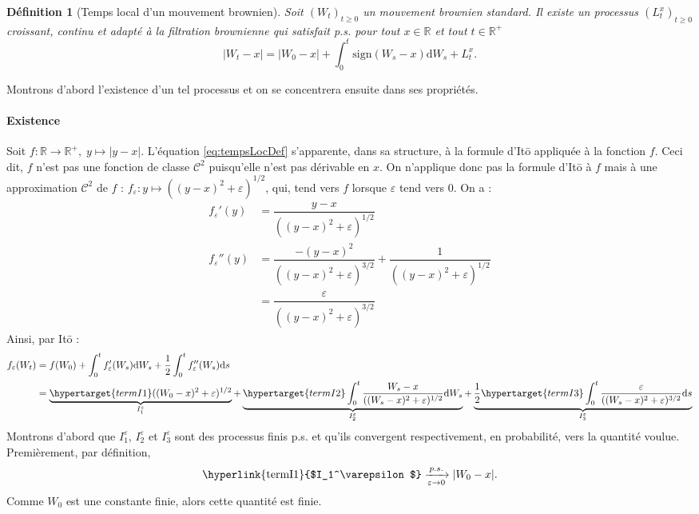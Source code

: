 \documentclass[openany]{book}
\makeatletter
\newcommand{\R}{\mathbb{R}}
\newcommand{\1}{\mathbbm{1}}
\newcommand{\sign}{\text{sign}}
\renewcommand{\d}{\mathrm{d}}
\renewenvironment{proof}[1][\textbf{\textit{Démonstration}}]{%
  \par\pushQED{\qed}%
  \normalfont\topsep6\p@\@plus6\p@\relax
  \trivlist\item[\hskip\labelsep
    #1\@addpunct{.}]\ignorespaces
}{%
  \popQED\endtrivlist\@endpefalse
}
\theoremstyle{thmfont}
\theoremstyle{deffont}
\newtheorem{definition}[definition]{Définition}
\theoremstyle{thmfont}
\theoremstyle{deffont}
\makeatother
\begin{document}
\begin{definition}[Temps local d'un mouvement brownien]
  \label{def:TempsLoc}
  Soit $(W_t)_{t\geq0}$ un mouvement brownien standard. Il existe un processus $(L_t^x)_{t\geq0}$ croissant, continu et adapté à la filtration brownienne qui satisfait p.s. pour tout $x \in \R$ et tout $t \in \R^+$
  \begin{equation}
    |W_t -x|  = |W_0-x| + \int_0^t\sign(W_s - x)\d W_s + L_t^x.
    \label{eq:tempsLocDef}
  \end{equation}
\end{definition}

\begin{proof} Montrons d'abord l'existence d'un tel processus et on se concentrera ensuite dans ses propriétés.

  \paragraph{Existence}
  Soit $f : \R \rightarrow \R^+,\; y \mapsto |y-x|$. L'équation \eqref{eq:tempsLocDef} s'apparente, dans sa structure, à la formule d'Itō appliquée à la fonction $f$. Ceci dit, $f$ n'est pas une fonction de classe $\mathcal C^2$ puisqu'elle n'est pas dérivable en $x$. On n'applique donc pas la formule d'Itō à $f$ mais à une approximation $\mathcal C^2$ de $f$ : $f_\varepsilon : y \mapsto ((y-x)^2 +\varepsilon)^{1/2}$, qui, tend vers $f$ lorsque $\varepsilon$ tend vers 0. On a :
  \begin{align*}
    f_\varepsilon'(y) &= \dfrac{y-x}{((y-x)^2 +\varepsilon)^{1/2}}\\
    f_\varepsilon''(y)&= \dfrac{-(y-x)^2}{((y-x)^2 +\varepsilon)^{3/2}} + \dfrac{1}{((y-x)^2 +\varepsilon)^{1/2}}\\
              &= \dfrac{\varepsilon}{((y-x)^2 +\varepsilon)^{3/2}}
  \end{align*}
  Ainsi, par Itō :
  \begin{align}
    f_\varepsilon(W_t) &= f(W_0) + \int_0^t f_\varepsilon'(W_s) \d W_s + \dfrac{1}{2} \int_0^t f_\varepsilon''(W_s) \d s\label{eq:tempsLocApprox}\\
             &= \underbrace{\hypertarget{termI1}((W_0 -x)^2 + \varepsilon)^{1/2}}_{I_1^\varepsilon}
               + \underbrace{\hypertarget{termI2}\int_0^t \dfrac{W_s-x}{((W_s-x)^2 +\varepsilon)^{1/2}}\d W_s}_{I_2^\varepsilon}
               + \underbrace{ \dfrac{1}{2} \hypertarget{termI3} \int_0^t \dfrac{\varepsilon}{((W_s-x)^2 +\varepsilon)^{3/2}} \d s}_{I_3^\varepsilon} \notag
  \end{align}
  Montrons d'abord que \hyperlink{termI1}{$I_1^\varepsilon$}, \hyperlink{termI2}{$I_2^\varepsilon$} et \hyperlink{termI1}{$I_3^\varepsilon$} sont des processus finis p.s. et qu'ils convergent respectivement, en probabilité, vers la quantité voulue. Premièrement, par définition,
  \begin{equation}\text{\hyperlink{termI1}{$I_1^\varepsilon$}} \xrightarrow[\varepsilon \to 0]{p.s.}  |W_0 -x|.\end{equation}
  \noindent Comme $W_0$ est une constante finie, alors cette quantité est finie.\\


\end{proof}
\end{document}
